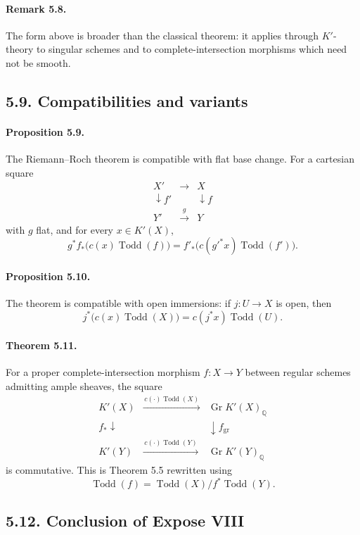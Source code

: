 \documentclass[11pt]{article}
\theoremstyle{plain}
\theoremstyle{definition}
\theoremstyle{remark}
\newcommand{\QQ}{\mathbb Q}
\DeclareMathOperator{\Gr}{Gr}
\providecommand{\xto}[1]{\xrightarrow{#1}}
\providecommand{\Todd}{\operatorname{Todd}}
\begin{document}
\paragraph{Remark 5.8.}
The form above is broader than the classical theorem: it applies through $K'$-theory to singular schemes and to complete-intersection morphisms which need not be smooth.

\subsection*{5.9. Compatibilities and variants}

\paragraph{Proposition 5.9.}
The Riemann--Roch theorem is compatible with flat base change. For a cartesian square
\[
\begin{array}{ccc}
X'&\longrightarrow&X\\
\downarrow f'&&\downarrow f\\
Y'&\xto{g}&Y
\end{array}
\]
with $g$ flat, and for every $x\in K'(X)$,
\[
 g^* f_*\bigl(c(x)\Todd(f)\bigr)=
 f'_*\bigl(c(g'^*x)\Todd(f')\bigr).
\]

\paragraph{Proposition 5.10.}
The theorem is compatible with open immersions: if $j:U\to X$ is open, then
\[
 j^*\bigl(c(x)\Todd(X)\bigr)=c(j^*x)\Todd(U).
\]

\paragraph{Theorem 5.11.}
For a proper complete-intersection morphism $f:X\to Y$ between regular schemes admitting ample sheaves, the square
\[
\begin{array}{ccc}
K'(X) & \xto{\,c(\cdot)\Todd(X)\,} & \Gr K'(X)_\QQ \\
\scriptstyle f_*\downarrow && \downarrow\scriptstyle f_{\mathrm{gr}} \\
K'(Y) & \xto{\,c(\cdot)\Todd(Y)\,} & \Gr K'(Y)_\QQ
\end{array}
\]
is commutative. This is Theorem 5.5 rewritten using
\[
\Todd(f)=\Todd(X)/f^*\Todd(Y).
\]

\subsection*{5.12. Conclusion of Expose VIII}
\end{document}
